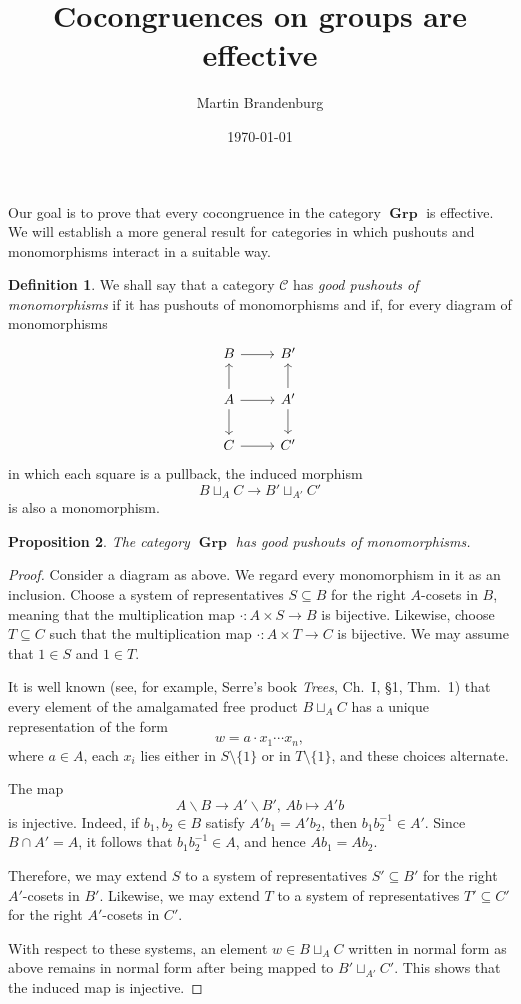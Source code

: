 \documentclass[a4paper,12pt,reqno]{amsart}
\title{Cocongruences on groups are effective}
\author{Martin Brandenburg}
\date{\today}
\theoremstyle{plain}
\newtheorem{prop}{Proposition}
\theoremstyle{definition}
\newtheorem{defi}[prop]{Definition}
\DeclareMathOperator{\Grp}{\mathbf{Grp}}
\newcommand{\C}{\mathcal{C}}
\begin{document}
\maketitle

Our goal is to prove that every cocongruence in the category $\Grp$ is effective. We will establish a more general result for categories in which pushouts and monomorphisms interact in a suitable way.

\begin{defi}
We shall say that a category $\C$ has \emph{good pushouts of monomorphisms} if it has pushouts of monomorphisms and if, for every diagram of monomorphisms
\[\begin{tikzcd}
B \ar{r} & B' \\
A \ar{r}  \ar{u} \ar{d} & A' \ar{u} \ar{d}  \\
C \ar{r} & C'
\end{tikzcd}\]
in which each square is a pullback, the induced morphism
\[B \sqcup_A C \to B' \sqcup_{A'} C'\]
is also a monomorphism.
\end{defi}

\begin{prop}
The category $\Grp$ has good pushouts of monomorphisms.
\end{prop}

\begin{proof}
Consider a diagram as above. We regard every monomorphism in it as an inclusion. Choose a system of representatives $S \subseteq B$ for the right $A$-cosets in $B$, meaning that the multiplication map $\cdot : A \times S \to B$ is bijective. Likewise, choose $T \subseteq C$ such that the multiplication map $\cdot : A \times T \to C$ is bijective. We may assume that $1 \in S$ and $1 \in T$.

It is well known (see, for example, Serre's book \emph{Trees}, Ch.\ I, §1, Thm.\ 1) that every element of the amalgamated free product $B \sqcup_A C$ has a unique representation of the form
\[w = a \cdot x_1 \cdots x_n,\]
where $a \in A$, each $x_i$ lies either in $S \setminus \{1\}$ or in $T \setminus \{1\}$, and these choices alternate.

The map
\[A \backslash B \to A' \backslash B', \, Ab \mapsto A'b\]
is injective. Indeed, if $b_1,b_2 \in B$ satisfy $A' b_1 = A' b_2$, then $b_1 b_2^{-1} \in A'$. Since $B \cap A' = A$, it follows that $b_1 b_2^{-1} \in A$, and hence $A b_1 = A b_2$.

Therefore, we may extend $S$ to a system of representatives $S' \subseteq B'$ for the right $A'$-cosets in $B'$. Likewise, we may extend $T$ to a system of representatives $T' \subseteq C'$ for the right $A'$-cosets in $C'$.

With respect to these systems, an element $w \in B \sqcup_A C$ written in normal form as above remains in normal form after being mapped to $B' \sqcup_{A'} C'$. This shows that the induced map is injective.
\end{proof}
\end{document}
